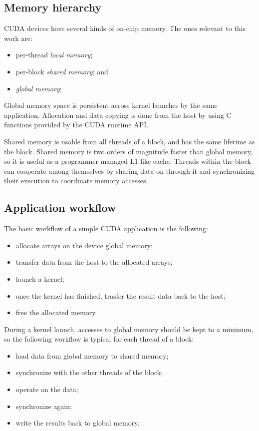 \subsection{Memory hierarchy}
\label{sub:memory-hierarchy}

CUDA devices have several kinds of on-chip memory.
The ones relevant to this work are:
\begin{itemize}
  \item per-thread \emph{local memory};
  \item per-block \emph{shared memory}; and
  \item \emph{global memory};
\end{itemize}

Global memory space is persistent across kernel launches
by the same application.
Allocation and data copying is done from the host
by using C functions provided by the CUDA runtime API.

Shared memory is usable from all threads of a block,
and has the same lifetime as the block.
Shared memory is two orders of magnitude faster than global memory,
so it is useful as a programmer-managed L1-like cache.
Threads within the block can cooperate among themselves
by sharing data on through it and synchronizing their execution
to coordinate memory accesses.

\subsection{Application workflow}
\label{sub:app-workflow}

The basic workflow of a simple CUDA application is the following:
\begin{itemize}
  \item allocate arrays on the device global memory;
  \item transfer data from the host to the allocated arrays;
  \item launch a kernel;
  \item once the kernel has finished,
    trasfer the result data back to the host;
  \item free the allocated memory.
\end{itemize}

During a kernel launch,
accesses to global memory should be kept to a minimum,
so the following workflow is typical for each thread of a block:
\begin{itemize}
  \item load data from global memory to shared memory;
  \item synchronize with the other threads of the block;
  \item operate on the data;
  \item synchronize again;
  \item write the results back to global memory.
\end{itemize}

